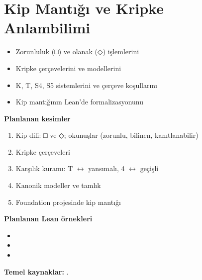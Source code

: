 \chapter{Kip Mantığı ve Kripke Anlambilimi}\label{bol:kip}

\begin{bolumhedefleri}
\begin{itemize}
  \item Zorunluluk ({\sembolfont □}) ve olanak ({\sembolfont ◇}) işlemlerini
  \item Kripke çerçevelerini ve modellerini
  \item K, T, S4, S5 sistemlerini ve çerçeve koşullarını
  \item Kip mantığının Lean'de formalizasyonunu
\end{itemize}
\end{bolumhedefleri}

\begin{taslakplan}
\textbf{Planlanan kesimler}
\begin{enumerate}[label=\thechapter.\arabic*, leftmargin=2.4em]
  \item Kip dili: {\sembolfont □} ve {\sembolfont ◇}; okunuşlar (zorunlu, bilinen, kanıtlanabilir)
  \item Kripke çerçeveleri
  \item Karşılık kuramı: T $↔$ yansımalı, 4 $↔$ geçişli
  \item Kanonik modeller ve tamlık
  \item Foundation projesinde kip mantığı
\end{enumerate}

\textbf{Planlanan Lean örnekleri}
\begin{itemize}
  \item {}
  \item {}
  \item {}
\end{itemize}

\textbf{Temel kaynaklar:} \citet{kripke1963,blackburn2001,foundation}.
\end{taslakplan}


